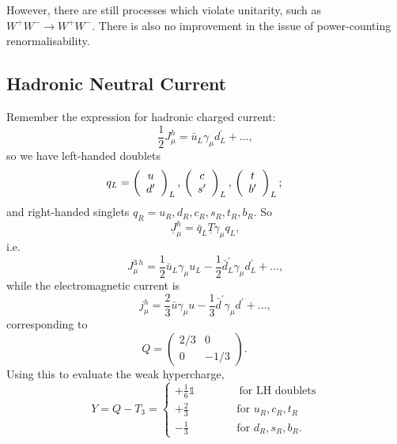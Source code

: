 \documentclass[a4paper,12pt]{article}
\begin{document}
However, there are still processes which violate unitarity, such as $W^+W^- \to W^+W^-$. There is also no improvement in the issue of power-counting renormalisability. 
%
\subsection{Hadronic Neutral Current}
%
Remember the expression for hadronic charged current:
\begin{equation}
\frac{1}{2}J_\mu^h = \bar{u}_L \gamma_\mu d^\prime_L + ...,
\end{equation}
so we have left-handed doublets
\[ q_L = \left( \begin{array}{cc}
u   \\
d^\prime   \end{array} \right)_L, \qquad
  \\ \left( \begin{array}{cc}
 c \\
s^\prime   \end{array} \right)_L, \qquad  \\ 
\left( \begin{array}{cc}
 t \\
b^\prime   \end{array} \right)_L; \qquad\] 
and right-handed singlets $q_R = u_R, d_R, c_R, s_R, t_R, b_R$.  So
\begin{equation}
\underline{J}^h_\mu = \bar{q}_L \underline{T} \gamma_\mu q_L,
\end{equation}
i.e.
\begin{equation}
J_\mu^{3\ h} = \frac{1}{2}\bar{u}_L \gamma_\mu u_L - \frac{1}{2} \bar{d}_L^\prime \gamma_\mu d_L^\prime + ...,
\end{equation}
while the electromagnetic current is
\begin{equation}
j_\mu^h = \frac{2}{3} \bar{u} \gamma_\mu u - \frac{1}{3} \bar{d}^\prime \gamma_\mu d^\prime + ...,
\end{equation}
corresponding to 
\[ Q = \left( \begin{array}{cc}
2/3 & 0   \\
0 & -1/3   \end{array} \right). \qquad \]
Using this to evaluate the weak hypercharge,
\begin{equation}
Y = Q - T_3 =
\begin{cases}
+\frac{1}{6}\mathds{1} \qquad \qquad \text{for LH doublets} \\
+\frac{2}{3} \qquad \qquad \text{  for } u_R, c_R, t_R \\
-\frac{1}{3} \qquad \qquad \text{  for } d_R, s_R, b_R. 
\end{cases}
\end{equation}
\end{document}
